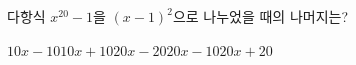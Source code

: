 다항식 $x^{20}-1$을 $(x-1)^2$으로 나누었을 때의 나머지는?
\begin{choices32}{$10x-10$}{$10x+10$}{$20x-20$}{$20x-10$}{$20x+20$}\end{choices32}

